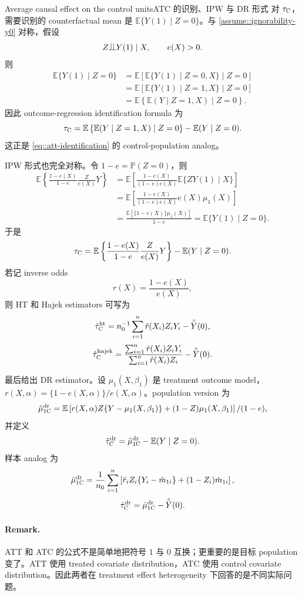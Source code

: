 \begin{exercisesolution}{Average causal effect on the control units}{ATC 的识别、IPW 与 DR 形式}
对 $\tau_\textsc{C}$，需要识别的 counterfactual mean 是 $\mathbb{E}\{Y(1)\mid Z=0\}$。与 \cref{assume::ignorability-y0} 对称，假设
\[
Z\ind Y(1)\mid X,\qquad e(X)>0.
\]
则
\begin{align*}
\mathbb{E}\{Y(1)\mid Z=0\}
&=\mathbb{E}\left[\mathbb{E}\{Y(1)\mid Z=0,X\}\mid Z=0\right] \\
&=\mathbb{E}\left[\mathbb{E}\{Y(1)\mid Z=1,X\}\mid Z=0\right] \\
&=\mathbb{E}\left\{\mathbb{E}(Y\mid Z=1,X)\mid Z=0\right\}.
\end{align*}
因此 outcome-regression identification formula 为
\[
\tau_\textsc{C}
=\mathbb{E}\left\{\mathbb{E}(Y\mid Z=1,X)\mid Z=0\right\}
 -\mathbb{E}(Y\mid Z=0).
\]
这正是 \cref{eq::att-identification} 的 control-population analog。

IPW 形式也完全对称。令 $1-e=\mathbb{P}(Z=0)$，则
\begin{align*}
\mathbb{E}\left\{
\frac{1-e(X)}{1-e}\frac{Z}{e(X)}Y
\right\}
&=\mathbb{E}\left[
\frac{1-e(X)}{(1-e)e(X)}
\mathbb{E}\{ZY(1)\mid X\}
\right] \\
&=\mathbb{E}\left[
\frac{1-e(X)}{(1-e)e(X)}
e(X)\mu_1(X)
\right] \\
&=\frac{\mathbb{E}[\{1-e(X)\}\mu_1(X)]}{1-e}
=\mathbb{E}\{Y(1)\mid Z=0\}.
\end{align*}
于是
\[
\tau_\textsc{C}
=\mathbb{E}\left\{
\frac{1-e(X)}{1-e}\frac{Z}{e(X)}Y
\right\}
-\mathbb{E}(Y\mid Z=0).
\]
若记 inverse odds
\[
r(X)=\frac{1-e(X)}{e(X)},
\]
则 HT 和 Hajek estimators 可写为
\[
\hat\tau_\textsc{C}^\textup{ht}
=n_0^{-1}\sum_{i=1}^n \hat r(X_i)Z_iY_i-\hat{\bar Y}(0),
\]
\[
\hat\tau_\textsc{C}^\textup{hajek}
=\frac{\sum_{i=1}^n \hat r(X_i)Z_iY_i}{\sum_{i=1}^n \hat r(X_i)Z_i}
 -\hat{\bar Y}(0).
\]

最后给出 DR estimator。设 $\mu_1(X,\beta_1)$ 是 treatment outcome model，$r(X,\alpha)=\{1-e(X,\alpha)\}/e(X,\alpha)$。population version 为
\[
\tilde\mu_{1\textsc{C}}^\textup{dr}
=\mathbb{E}\left[
r(X,\alpha)Z\{Y-\mu_1(X,\beta_1)\}
+(1-Z)\mu_1(X,\beta_1)
\right]/(1-e),
\]
并定义
\[
\tilde\tau_\textsc{C}^\textup{dr}
=\tilde\mu_{1\textsc{C}}^\textup{dr}-\mathbb{E}(Y\mid Z=0).
\]
样本 analog 为
\[
\hat\mu_{1\textsc{C}}^\textup{dr}
=\frac{1}{n_0}\sum_{i=1}^n
\left[
\hat r_iZ_i\{Y_i-\hat m_{1i}\}
+(1-Z_i)\hat m_{1i}
\right],
\]
\[
\hat\tau_\textsc{C}^\textup{dr}
=\hat\mu_{1\textsc{C}}^\textup{dr}-\hat{\bar Y}(0).
\]

\paragraph{Remark.}
ATT 和 ATC 的公式不是简单地把符号 $1$ 与 $0$ 互换；更重要的是目标 population 变了。ATT 使用 treated covariate distribution，ATC 使用 control covariate distribution。因此两者在 treatment effect heterogeneity 下回答的是不同实际问题。
\end{exercisesolution}

